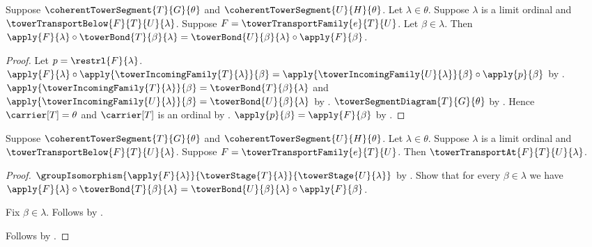 \begin{proposition}\label{tower_transport_family_limit_square}
    Suppose $\coherentTowerSegment{T}{G}{\theta}$ and
        $\coherentTowerSegment{U}{H}{\theta}$.
    Let $\lambda\in\theta$.
    Suppose $\lambda$ is a limit ordinal and
        $\towerTransportBelow{F}{T}{U}{\lambda}$.
    Suppose $F=\towerTransportFamily{e}{T}{U}$.
    Let $\beta\in\lambda$.
    Then $\apply{F}{\lambda}\circ\towerBond{T}{\beta}{\lambda}=
        \towerBond{U}{\beta}{\lambda}\circ\apply{F}{\beta}$.
\end{proposition}
\begin{proof}
    Let $p=\restrl{F}{\lambda}$.
    $\apply{F}{\lambda}\circ
            \apply{\towerIncomingFamily{T}{\lambda}}{\beta}=
        \apply{\towerIncomingFamily{U}{\lambda}}{\beta}\circ
            \apply{p}{\beta}$ by
        .
    $\apply{\towerIncomingFamily{T}{\lambda}}{\beta}=
        \towerBond{T}{\beta}{\lambda}$ and
        $\apply{\towerIncomingFamily{U}{\lambda}}{\beta}=
        \towerBond{U}{\beta}{\lambda}$ by
        .
    $\towerSegmentDiagram{T}{G}{\theta}$ by
        .
    Hence $\carrier[T]=\theta$ and $\carrier[T]$ is an ordinal by
        .
    $\apply{p}{\beta}=\apply{F}{\beta}$ by
        .
\end{proof}

\begin{proposition}\label{tower_transport_at_limit}
    Suppose $\coherentTowerSegment{T}{G}{\theta}$ and
        $\coherentTowerSegment{U}{H}{\theta}$.
    Let $\lambda\in\theta$.
    Suppose $\lambda$ is a limit ordinal and
        $\towerTransportBelow{F}{T}{U}{\lambda}$.
    Suppose $F=\towerTransportFamily{e}{T}{U}$.
    Then $\towerTransportAt{F}{T}{U}{\lambda}$.
\end{proposition}
\begin{proof}
    $\groupIsomorphism{\apply{F}{\lambda}}
        {\towerStage{T}{\lambda}}{\towerStage{U}{\lambda}}$ by
        .
    Show that for every $\beta\in\lambda$ we have
        $\apply{F}{\lambda}\circ\towerBond{T}{\beta}{\lambda}=
        \towerBond{U}{\beta}{\lambda}\circ\apply{F}{\beta}$.
    \begin{subproof}
        Fix $\beta\in\lambda$.
        Follows by .
    \end{subproof}
    Follows by .
\end{proof}

